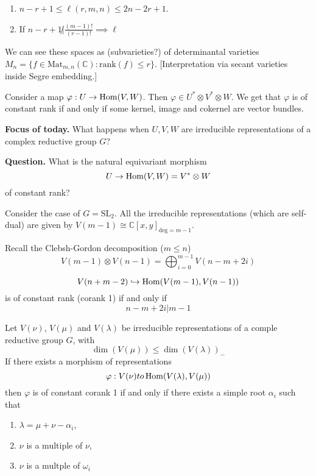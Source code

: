 {\begin{theorem}[Westwick '86]
\label{theorem-Westwick}
\begin{enumerate}
\item $n-r+1 \leq \ell(r,m,n) \leq 2n-2r+1$.
\item If $n-r+1 \not| \frac{(m-1)!}{(r-1)!}\implies \ell$
\end{enumerate}
\end{theorem}

We can see these spaces as (subvarieties?) of determinantal varieties
$M_n=\{f \in \text{Mat}_{m,n}(\mathbb{C}):\text{rank}(f) \leq  r\}$. 
[Interpretation via secant varieties inside Segre embedding.]

\medskip\noindent
Consider a map $\varphi: U \to \mathop{\mathrm{Hom}}\nolimits(V,W)$.
Then $\varphi \in U^* \otimes  V^* \otimes  W$.
We get that
$\varphi$ is of constant rank if and only if
some kernel, image and cokernel are vector bundles.

\medskip\noindent
{\bf Focus of today.} What happens when $U,V,W$ are irreducible
representations of a complex reductive group  $G$?

\medskip\noindent
{\bf Question.} What is the natural equivariant morphism
$$
U \to \mathop{\mathrm{Hom}}\nolimits(V,W)=V^* \otimes  W
$$
of constant rank?

\medskip\noindent
Consider the case of $G=\text{SL}_2$. All the 
irreducible representations (which are self-dual) are given by
$V(m-1)\cong \mathbb{C}[x,y]_{\text{deg}=m-1}$.

Recall the Clebsh-Gordon decomposition ($m \leq  n$)
$$
V(m-1)\otimes  V(n-1)=\bigoplus_{i=0}^{m-1}V(n-m+2i)
$$

\begin{theorem}
\label{theorem-BFL22}
$$
V(n+m-2)\hookrightarrow \mathop{\mathrm{Hom}}\nolimits(V(m-1),V(n-1))
$$
is of constant rank (corank 1) if and only if
$$
n-m+2i|m-1
$$
\end{theorem}

\begin{theorem}
\label{theorem-BFF25}
Let $V(\nu)$, $V(\mu)$ and $V(\lambda)$ be irreducible representations
of a comple reductive group $G$, with 
$$
\dim(V(\mu)) \leq \dim(V(\lambda))_-
$$
If there exists a morphism of representations
$$
\varphi: V (\nu) to \mathop{\mathrm{Hom}}\nolimits (V (\lambda),V(\mu))
$$
then $\varphi$ is of constant corank 1 if and only if 
there exists a simple root $\alpha_i$ such that
\begin{enumerate}
\item $\lambda=\mu+\nu-\alpha_i$,
\item $\nu$ is a multiple of $\nu$,
\item  $\nu$ is a multple of $\omega_i$
\end{enumerate}
\end{theorem} 

}
